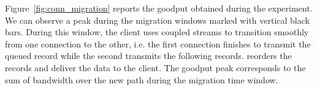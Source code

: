
Figure~\ref{fig:conn_migration} reports the goodput obtained during the 
experiment. We can observe a peak during the migration windows marked with 
vertical black bars. %
During this window, the client uses coupled streams to transition smoothly from 
one \tcp connection to the other, i.e. the first \tcp connection finishes to 
transmit the queued \tcpls record while the second transmits the following 
records.
\tcpls reorders the records and deliver the data to the 
client. The goodput peak corresponds to the sum of bandwidth over 
the new path during the migration time window.

